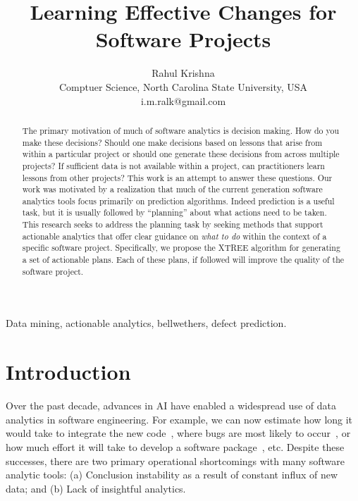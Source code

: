 \documentclass[conference]{IEEEtran}
\newcommand{\be}{\begin{enumerate}}
\newcommand{\ee}{\end{enumerate}}
\begin{document}
\title{Learning Effective Changes for  Software Projects\\[-0.8cm]}
\author{Rahul Krishna\\
	Comptuer Science, North Carolina State University, USA\\
	i.m.ralk@gmail.com}

\maketitle


\begin{abstract}

The primary motivation of much of software analytics is decision making. How do you make these decisions? Should one make decisions based on lessons that arise from within a particular project or should one generate these decisions from across multiple projects? If sufficient data is not available within a project, can practitioners learn lessons from other projects? This work is an attempt to answer these questions. Our work was motivated by a realization that much of the current generation software analytics tools focus primarily on prediction algorithms. Indeed prediction is a useful task, but it is usually followed by ``planning'' about what actions need to be taken. This research seeks to address the planning task by seeking methods that support actionable analytics that offer clear guidance on \textit{what to do} within the context of a specific software project. Specifically, we propose the XTREE algorithm for generating a set of actionable plans. Each of these plans, if followed will improve the quality of the software project.

\end{abstract}

\begin{IEEEkeywords}
Data mining, actionable analytics, bellwethers, defect prediction.
\end{IEEEkeywords}


\section{Introduction}
\label{sect:intro}

Over the past decade, advances in AI have enabled a widespread use of data analytics in software engineering. For example, we can now estimate	how long it would take to integrate the new code~\cite{czer11}, where bugs are most likely to occur~\cite{ostrand04,Menzies2007a}, or how much effort it will take to develop a software package~\cite{turhan11,koc11b}, etc. Despite these successes, there are two primary operational shortcomings with many software analytic tools: (a) Conclusion instability as a result of constant influx of new data; and (b) Lack of insightful analytics.
\end{document}
